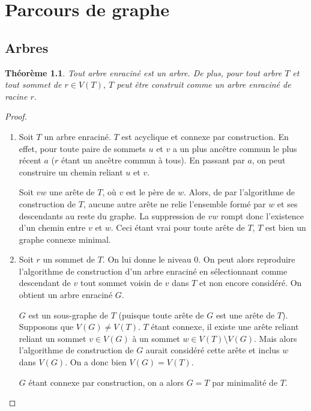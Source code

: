 \documentclass[10pt]{book}
\theoremstyle{plain}
\newtheorem{theoreme}{Th\'eor\`eme}[chapter]
\theoremstyle{definition}
\begin{document}
\chapter{Parcours de graphe}



\section{Arbres}


\begin{theoreme}
Tout arbre enraciné est un arbre. De plus, pour tout arbre $T$ et tout sommet de $r\in V(T)$, $T$ peut être construit comme un arbre enraciné de racine $r$.
\end{theoreme}

\begin{proof}
\begin{enumerate}
\item Soit $T$ un arbre enraciné. $T$ est acyclique et connexe par construction. En effet, pour toute paire de sommets $u$ et $v$ a un plus ancêtre commun le plus récent $a$ ($r$ étant un ancêtre commun à tous). En passant par $a$, on peut construire un chemin reliant $u$ et $v$.


  Soit $vw$ une arête de $T$, o\`u $v$ est le père de $w$. Alors, de par l'algorithme de construction de $T$, aucune autre arête ne relie l'ensemble formé par $w$ et ses descendants au reste du graphe. La suppression de $vw$ rompt donc l'existence d'un chemin entre $v$ et $w$. Ceci étant vrai pour toute arête de $T$, $T$ est bien un graphe connexe minimal. 

\item  Soit $r$ un sommet de $T$. On lui donne le niveau $0$. On peut alors reproduire l'algorithme de construction d'un arbre enraciné en sélectionnant comme descendant de $v$ tout sommet voisin de $v$ dans $T$ et non encore considéré. On obtient un arbre enraciné $G$.

  $G$ est un sous-graphe de $T$ (puisque toute arête de $G$ est une arête de $T$). Supposons que $V(G)\neq V(T)$. $T$ étant connexe, il existe une arête reliant reliant un sommet $v\in V(G)$ à un sommet $w\in V(T)\setminus V(G)$. Mais alors l'algorithme de construction de $G$ aurait considéré cette arête et inclus $w$ dans $V(G)$. On a donc bien $V(G)=V(T)$.
  
  $G$ étant connexe par construction, on a alors $G=T$ par minimalité de $T$.  
\end{enumerate}
\end{proof}
\end{document}
